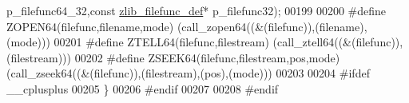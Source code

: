 \begin{DoxyCode}
      p\_filefunc64\_32,\textcolor{keyword}{const} \hyperlink{structzlib__filefunc__def__s}{zlib\_filefunc\_def}* p\_filefunc32);
00199 
00200 \textcolor{preprocessor}{#define ZOPEN64(filefunc,filename,mode)         (call\_zopen64((&(filefunc)),(filename),(mode)))}
00201 \textcolor{preprocessor}{#define ZTELL64(filefunc,filestream)            (call\_ztell64((&(filefunc)),(filestream)))}
00202 \textcolor{preprocessor}{#define ZSEEK64(filefunc,filestream,pos,mode)   (call\_zseek64((&(filefunc)),(filestream),(pos),(mode)))}
00203 
00204 \textcolor{preprocessor}{#ifdef \_\_cplusplus}
00205 \}
00206 \textcolor{preprocessor}{#endif}
00207 
00208 \textcolor{preprocessor}{#endif}
\end{DoxyCode}
